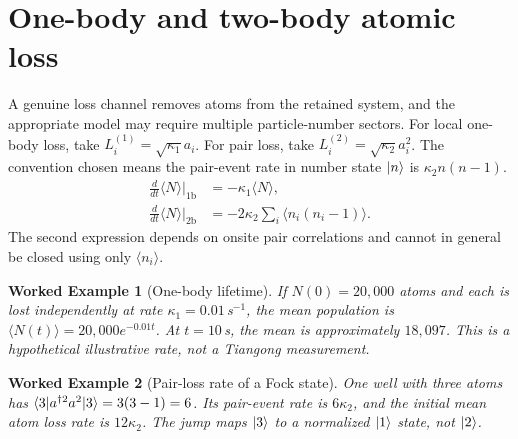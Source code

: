 \documentclass[11pt,a4paper]{article}
\newtheorem{example}{Worked Example}\newtheorem{remark}{Physical qualification}
\begin{document}
\section{One-body and two-body atomic loss}
A genuine loss channel removes atoms from the retained system, and the appropriate model may require multiple particle-number sectors. For local one-body loss, take $L_i^{(1)}=\sqrt{\kappa_1}a_i$. For pair loss, take $L_i^{(2)}=\sqrt{\kappa_2}a_i^2$. The convention chosen means the pair-event rate in number state $|n\rangle$ is $\kappa_2n(n-1)$.
\begin{align}
\frac d{dt}\langle N\rangle\bigg|_{1\mathrm{b}}&=-\kappa_1\langle N\rangle,\\
\frac d{dt}\langle N\rangle\bigg|_{2\mathrm{b}}&=-2\kappa_2\sum_i\langle n_i(n_i-1)\rangle.
\end{align}
The second expression depends on onsite pair correlations and cannot in general be closed using only $\langle n_i\rangle$.
\begin{example}[One-body lifetime]
If $N(0)=20{,}000$ atoms and each is lost independently at rate $\kappa_1=0.01\,$s$^{-1}$, the mean population is $\langle N(t)\rangle=20{,}000e^{-0.01t}$. At $t=10\,$s, the mean is approximately $18{,}097$. This is a hypothetical illustrative rate, not a Tiangong measurement.
\end{example}
\begin{example}[Pair-loss rate of a Fock state]
One well with three atoms has $\langle3| a^{\dagger2}a^2|3\rangle=3(3-1)=6$. Its pair-event rate is $6\kappa_2$, and the initial mean atom loss rate is $12\kappa_2$. The jump maps $|3\rangle$ to a normalized $|1\rangle$ state, not $|2\rangle$.
\end{example}
\end{document}
